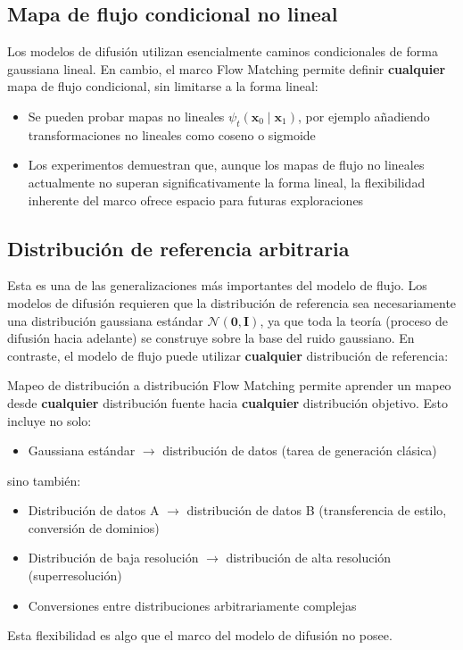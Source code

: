 \documentclass[a4paper]{article}
\begin{document}
\subsection{Mapa de flujo condicional no lineal}

Los modelos de difusión utilizan esencialmente caminos condicionales de forma gaussiana lineal. En cambio, el marco Flow Matching permite definir \textbf{cualquier} mapa de flujo condicional, sin limitarse a la forma lineal:

\begin{itemize}
    \item Se pueden probar mapas no lineales $\psi_t(\mathbf{x}_0 \mid \mathbf{x}_1)$, por ejemplo añadiendo transformaciones no lineales como coseno o sigmoide
    \item Los experimentos demuestran que, aunque los mapas de flujo no lineales actualmente no superan significativamente la forma lineal, la flexibilidad inherente del marco ofrece espacio para futuras exploraciones
\end{itemize}

\subsection{Distribución de referencia arbitraria}

Esta es una de las generalizaciones más importantes del modelo de flujo. Los modelos de difusión requieren que la distribución de referencia sea necesariamente una distribución gaussiana estándar $\mathcal{N}(\mathbf{0}, \mathbf{I})$, ya que toda la teoría (proceso de difusión hacia adelante) se construye sobre la base del ruido gaussiano. En contraste, el modelo de flujo puede utilizar \textbf{cualquier} distribución de referencia:

\begin{importantbox}{Mapeo de distribución a distribución}
Flow Matching permite aprender un mapeo desde \textbf{cualquier} distribución fuente hacia \textbf{cualquier} distribución objetivo. Esto incluye no solo:
\begin{itemize}
    \item Gaussiana estándar $\to$ distribución de datos (tarea de generación clásica)
\end{itemize}
sino también:
\begin{itemize}
    \item Distribución de datos A $\to$ distribución de datos B (transferencia de estilo, conversión de dominios)
    \item Distribución de baja resolución $\to$ distribución de alta resolución (superresolución)
    \item Conversiones entre distribuciones arbitrariamente complejas
\end{itemize}
Esta flexibilidad es algo que el marco del modelo de difusión no posee.
\end{importantbox}
\end{document}
